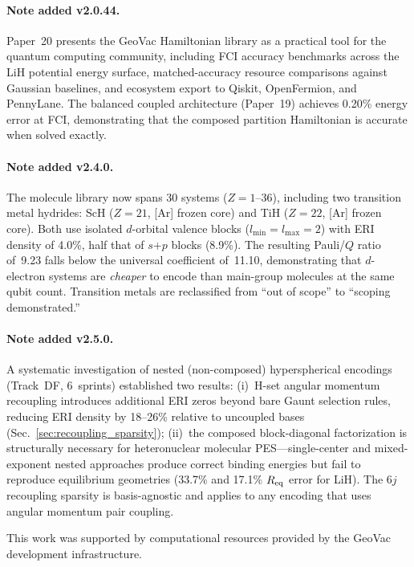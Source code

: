 \documentclass[aps,pra,twocolumn,superscriptaddress,longbibliography]{revtex4-2}
\begin{document}
\paragraph{Note added v2.0.44.}
Paper~20 presents the GeoVac Hamiltonian library as a practical tool
for the quantum computing community, including FCI accuracy benchmarks
across the LiH potential energy surface, matched-accuracy resource
comparisons against Gaussian baselines, and ecosystem export to
Qiskit, OpenFermion, and PennyLane.  The balanced coupled architecture
(Paper~19) achieves 0.20\% energy error at FCI, demonstrating that
the composed partition Hamiltonian is accurate when solved exactly.

\paragraph{Note added v2.4.0.}
The molecule library now spans 30 systems ($Z = 1$--36), including
two transition metal hydrides: ScH ($Z = 21$, [Ar] frozen core) and
TiH ($Z = 22$, [Ar] frozen core).  Both use isolated $d$-orbital
valence blocks ($l_{\min} = l_{\max} = 2$) with ERI density of 4.0\%,
half that of $s$+$p$ blocks (8.9\%).  The resulting Pauli/$Q$
ratio of~9.23 falls below the universal coefficient of~11.10,
demonstrating that $d$-electron systems are \emph{cheaper} to encode
than main-group molecules at the same qubit count.  Transition metals
are reclassified from ``out of scope'' to ``scoping demonstrated.''

\paragraph{Note added v2.5.0.}
A systematic investigation of nested (non-composed) hyperspherical
encodings (Track~DF, 6~sprints) established two results:
(i)~H-set angular momentum recoupling introduces additional ERI zeros
beyond bare Gaunt selection rules, reducing ERI density by 18--26\%
relative to uncoupled bases (Sec.~\ref{sec:recoupling_sparsity});
(ii)~the composed block-diagonal factorization is structurally necessary
for heteronuclear molecular PES---single-center and mixed-exponent
nested approaches produce correct binding energies but fail to reproduce
equilibrium geometries (33.7\% and 17.1\% $R_{\rm eq}$ error for LiH).
The 6$j$ recoupling sparsity is basis-agnostic and applies to any
encoding that uses angular momentum pair coupling.

\begin{acknowledgments}
This work was supported by computational resources provided by the GeoVac
development infrastructure.
\end{acknowledgments}
\end{document}
